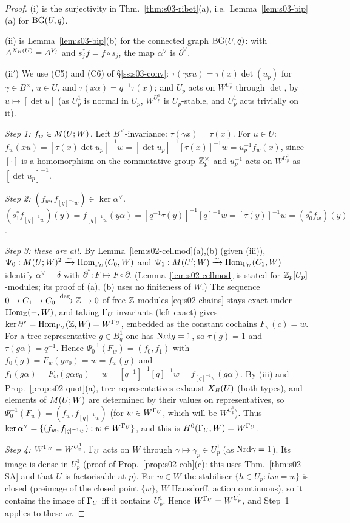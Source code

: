 \begin{proof}
(i) is the surjectivity in Thm.~\ref{thm:s03-ribet}(a), i.e.\ Lemma~\ref{lem:s03-bip}(a) for $\mathrm{BG}(U,q)$.

(ii) is Lemma~\ref{lem:s03-bip}(b) for the connected graph $\mathrm{BG}(U,q)$: with $A^{X_B(U)}=A^{V_j}$ and $s_j^*f=f\circ s_j$, the map $\alpha^\vee$ is
$\partial^\vee$.

(ii$'$) We use (C5) and (C6) of \S\ref{ss:s03-conv}: $\tau(\gamma xu)=\tau(x)\det(u_p)$ for $\gamma\in B^\times$, $u\in U$, and
$\tau(x\alpha)=q^{-1}\tau(x)$; and $U_p$ acts on $W^{U^1_p}$ through $\det$, by $u\mapsto[\det u]$ (as $U^1_p$ is normal in $U_p$, $W^{U^1_p}$ is
$U_p$-stable, and $U^1_p$ acts trivially on it).

\emph{Step 1: $f_w\in M(U;W)$.} Left $B^\times$-invariance: $\tau(\gamma x)=\tau(x)$. For $u\in U$:
$f_w(xu)=[\tau(x)\det u_p]^{-1}w=[\det u_p]^{-1}[\tau(x)]^{-1}w=u_p^{-1}f_w(x)$, since $[\cdot]$ is a homomorphism on the commutative group $\mathbb{Z}_p^\times$
and $u_p^{-1}$ acts on $W^{U^1_p}$ as $[\det u_p]^{-1}$.

\emph{Step 2: $(f_w,f_{[q]^{-1}w})\in\ker\alpha^\vee$.} $(s_1^*f_{[q]^{-1}w})(y)=f_{[q]^{-1}w}(y\alpha)=[q^{-1}\tau(y)]^{-1}[q]^{-1}w=[\tau(y)]^{-1}w
=(s_0^*f_w)(y)$.

\emph{Step 3: these are all.} By Lemma~\ref{lem:s02-cellmod}(a),(b) (given (iii)), $\Psi_0:M(U;W)^2\xrightarrow\sim\operatorname{Hom}_{\Gamma_U}(C_0,W)$ and
$\Psi_1:M(U';W)\xrightarrow\sim\operatorname{Hom}_{\Gamma_U}(C_1,W)$ identify $\alpha^\vee=\delta$ with $\partial^*:F\mapsto F\circ\partial$. (Lemma~\ref{lem:s02-cellmod} is
stated for $\mathbb{Z}_p[U_p]$-modules; its proof of (a), (b) uses no finiteness of $W$.) The sequence $0\to C_1\to C_0\xrightarrow{\deg}\mathbb{Z}\to0$ of free
$\mathbb{Z}$-modules \eqref{eq:s02-chains} stays exact under $\operatorname{Hom}_{\mathbb{Z}}(-,W)$, and taking $\Gamma_U$-invariants (left exact) gives
$\ker\partial^*=\operatorname{Hom}_{\Gamma_U}(\mathbb{Z},W)=W^{\Gamma_U}$, embedded as the constant cochains $F_w(c)=w$. For a tree representative $g\in B^1_q$ one has
$\mathrm{Nrd} g=1$, so $\tau(g)=1$ and $\tau(g\alpha)=q^{-1}$. Hence $\Psi_0^{-1}(F_w)=(f_0,f_1)$ with $f_0(g)=F_w(gv_0)=w=f_w(g)$ and
$f_1(g\alpha)=F_w(g\alpha v_0)=w=[q^{-1}]^{-1}[q]^{-1}w=f_{[q]^{-1}w}(g\alpha)$. By (iii) and Prop.~\ref{prop:s02-quot}(a), tree representatives exhaust
$X_B(U)$ (both types), and elements of $M(U;W)$ are determined by their values on representatives, so $\Psi_0^{-1}(F_w)=(f_w,f_{[q]^{-1}w})$ (for
$w\in W^{\Gamma_U}$, which will be $W^{U^1_p}$). Thus $\ker\alpha^\vee=\{(f_w,f_{[q]^{-1}w}):w\in W^{\Gamma_U}\}$, and this is $H^0(\Gamma_U,W)=W^{\Gamma_U}$.

\emph{Step 4: $W^{\Gamma_U}=W^{U^1_p}$.} $\Gamma_U$ acts on $W$ through $\gamma\mapsto\gamma_p\in U^1_p$ (as $\mathrm{Nrd}\gamma=1$). Its image is dense in $U^1_p$ (proof of
Prop.~\ref{prop:s02-coh}(c): this uses Thm.~\ref{thm:s02-SA} and that $U$ is factorisable at $p$). For $w\in W$ the stabiliser
$\{h\in U_p:hw=w\}$ is closed (preimage of the closed point $\{w\}$, $W$ Hausdorff, action continuous), so it contains the image of $\Gamma_U$ iff it contains
$U^1_p$. Hence $W^{\Gamma_U}=W^{U^1_p}$, and Step~1 applies to these $w$.
\end{proof}

